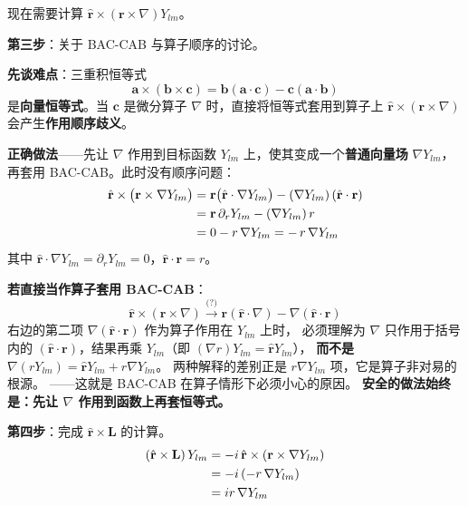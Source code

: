 现在需要计算 $\hat{\mathbf{r}}\times(\mathbf{r}\times\nabla)Y_{lm}$。

\textbf{第三步}：关于 BAC-CAB 与算子顺序的讨论。

\textbf{先谈难点}：三重积恒等式
\begin{equation}
\mathbf{a}\times(\mathbf{b}\times\mathbf{c}) = \mathbf{b}(\mathbf{a}\cdot\mathbf{c}) - \mathbf{c}(\mathbf{a}\cdot\mathbf{b})
\tag{BAC-CAB}
\end{equation}
是\textbf{向量恒等式}。当 $\mathbf{c}$ 是微分算子 $\nabla$ 时，直接将恒等式套用到算子上
$\hat{\mathbf{r}}\times(\mathbf{r}\times\nabla)$ 会产生\textbf{作用顺序歧义}。

\textbf{正确做法}——先让 $\nabla$ 作用到目标函数 $Y_{lm}$ 上，使其变成一个\textbf{普通向量场} $\nabla Y_{lm}$，
再套用 BAC-CAB。此时没有顺序问题：
\begin{align}
\hat{\mathbf{r}}\times\bigl(\mathbf{r}\times\nabla Y_{lm}\bigr)
&= \mathbf{r}\bigl(\hat{\mathbf{r}}\cdot\nabla Y_{lm}\bigr) - (\nabla Y_{lm})\,(\hat{\mathbf{r}}\cdot\mathbf{r}) \notag\\
&= \mathbf{r}\,\partial_r Y_{lm} - (\nabla Y_{lm})\,r \notag\\
&= 0 - r\,\nabla Y_{lm} = -\,r\,\nabla Y_{lm}
\end{align}
其中 $\hat{\mathbf{r}}\cdot\nabla Y_{lm} = \partial_r Y_{lm} = 0$，$\hat{\mathbf{r}}\cdot\mathbf{r} = r$。

\textbf{若直接当作算子套用 BAC-CAB}：
$$
\hat{\mathbf{r}}\times(\mathbf{r}\times\nabla) \xrightarrow{\text{(?)}}
\mathbf{r}(\hat{\mathbf{r}}\cdot\nabla) - \nabla(\hat{\mathbf{r}}\cdot\mathbf{r})
$$
右边的第二项 $\nabla(\hat{\mathbf{r}}\cdot\mathbf{r})$ 作为算子作用在 $Y_{lm}$ 上时，
必须理解为 $\nabla$ 只作用于括号内的 $(\hat{\mathbf{r}}\cdot\mathbf{r})$，结果再乘 $Y_{lm}$（即 $(\nabla r)Y_{lm} = \hat{\mathbf{r}}Y_{lm}$），
\textbf{而不是} $\nabla(r Y_{lm}) = \hat{\mathbf{r}}Y_{lm} + r\nabla Y_{lm}$。
两种解释的差别正是 $r\nabla Y_{lm}$ 项，它是算子非对易的根源。
——这就是 BAC-CAB 在算子情形下必须小心的原因。
\textbf{安全的做法始终是：先让 $\nabla$ 作用到函数上再套恒等式。}

\textbf{第四步}：完成 $\hat{\mathbf{r}}\times\mathbf{L}$ 的计算。
\begin{align}
(\hat{\mathbf{r}}\times\mathbf{L})\,Y_{lm}
&= -i\,\hat{\mathbf{r}}\times(\mathbf{r}\times\nabla Y_{lm}) \notag\\
&= -i\,(-r\,\nabla Y_{lm}) \notag\\
&= i r\,\nabla Y_{lm}
\end{align}

